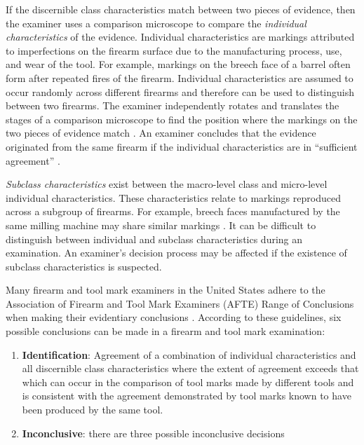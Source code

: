 \documentclass[11pt,]{isuthesis}
\begin{document}
If the discernible class characteristics match between two pieces of evidence, then the examiner uses a comparison microscope to compare the \emph{individual characteristics} of the evidence.
Individual characteristics are markings attributed to imperfections on the firearm surface due to the manufacturing process, use, and wear of the tool.
For example, markings on the breech face of a barrel often form after repeated fires of the firearm.
Individual characteristics are assumed to occur randomly across different firearms and therefore can be used to distinguish between two firearms.
The examiner independently rotates and translates the stages of a comparison microscope to find the position where the markings on the two pieces of evidence match \citep{Zheng2014}.
An examiner concludes that the evidence originated from the same firearm if the individual characteristics are in ``sufficient agreement'' \citep{AFTE1992}.

\emph{Subclass characteristics} exist between the macro-level class and micro-level individual characteristics.
These characteristics relate to markings reproduced across a subgroup of firearms.
For example, breech faces manufactured by the same milling machine may share similar markings \citep{firearmManufacturing}.
It can be difficult to distinguish between individual and subclass characteristics during an examination.
An examiner's decision process may be affected if the existence of subclass characteristics is suspected.

Many firearm and tool mark examiners in the United States adhere to the Association of Firearm and Tool Mark Examiners (AFTE) Range of Conclusions when making their evidentiary conclusions \citep{AFTE1992}.
According to these guidelines, six possible conclusions can be made in a firearm and tool mark examination:

\begin{enumerate}
\def\labelenumi{\arabic{enumi}.}
\item
  \textbf{Identification}: Agreement of a combination of individual characteristics and all discernible class characteristics where the extent of agreement exceeds that which can occur in the comparison of tool marks made by different tools and is consistent with the agreement demonstrated by tool marks known to have been produced by the same tool.
\item
  \textbf{Inconclusive}: there are three possible inconclusive decisions
\end{enumerate}
\end{document}
